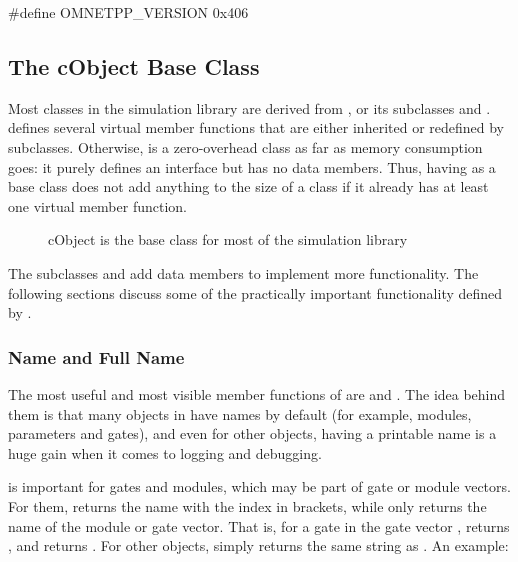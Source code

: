 \begin{cpp}
#define OMNETPP_VERSION 0x406
\end{cpp}


\subsection{The cObject Base Class}
\label{sec:sim-lib:cobject}

Most classes in the simulation library are derived from ,
or its subclasses  and .
 defines several virtual member functions that are either
inherited or redefined by subclasses. Otherwise,  is a
zero-overhead class as far as memory consumption goes: it purely defines an
interface but has no data members. Thus, having  as a base
class does not add anything to the size of a class if it already has at
least one virtual member function.

\begin{figure}[htbp]
  \begin{center}
    
    \caption{cObject is the base class for most of the simulation library}
  \end{center}
\end{figure}

The subclasses  and  add data
members to implement more functionality. The following sections discuss
some of the practically important functionality defined by .


\subsubsection{Name and Full Name}
\label{sec:sim-lib:object-name}

The most useful and most visible member functions of  are
 and . The idea behind them is that
many objects in {\opp} have names by default (for example, modules,
parameters and gates), and even for other objects, having a printable name
is a huge gain when it comes to logging and debugging.

 is important for gates and modules, which may be part
of gate or module vectors. For them,  returns the name
with the index in brackets, while  only returns the name
of the module or gate vector. That is, for a gate  in the gate
vector ,  returns , and
 returns . For other objects,
 simply returns the same string as .
An example:

